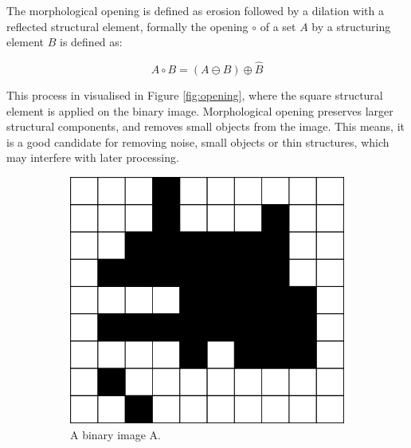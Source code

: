 \documentclass[
  digital,     %
  oneside,     %
  nosansbold,  %
  nocolorbold, %
  lof,         %
  lot,         %
]{fithesis4}
\begin{document}
The morphological opening is defined as erosion followed by a dilation with a
reflected structural element, formally the opening $\circ$ of a set $A$ by a structuring
element $B$ is defined as\cite{soile2004}:

$$A \circ B = (A \ominus B) \oplus \hat{B} $$

This process in visualised in Figure \ref{fig:opening}, where the square
structural element is applied on the binary image. Morphological opening
preserves larger structural components, and removes small objects from the
image. This means, it is a good candidate for removing noise, small objects or
thin structures, which may interfere with later processing.

\begin{figure}
    \begin{subfigure}[t]{0.4\textwidth}
        \centering
        \includegraphics[width=\textwidth]{resources/inkscape/opening_orig.png}
        \caption{A binary image A.}
        \label{fig:opening_orig}
    \end{subfigure}
    \begin{subfigure}[t]{0.4\textwidth}
        \centering

\end{subfigure}
\end{figure}
\end{document}
